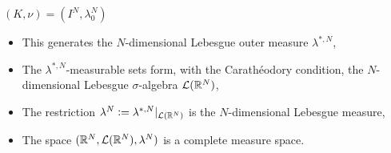 $(K, \nu) = (I^N, \lambda_0^N)$

\begin{itemize}
    \item This generates the $N$-dimensional Lebesgue outer measure $\lambda^{* ,N}$,
    \item The $\lambda^{* ,N}$-measurable sets form, with the Carathéodory condition, the $N$-dimensional Lebesgue $\sigma$-algebra $\mathcal{L}(\mathbb{R}^N)$,
    \item The restriction $\lambda^N \mathrel{\mathop:}= \lambda^{* ,N}|_{\mathcal{L}(\mathbb{R}^N)}$ is the $N$-dimensional Lebesgue measure,
    \item The space $(\mathbb{R}^N, \mathcal{L}(\mathbb{R}^N), \lambda^N)$ is a complete measure space.
\end{itemize}

